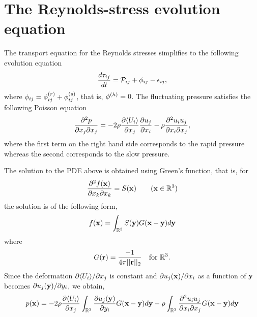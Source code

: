 \documentclass[oneside,a4paper,11pt]{report}
\begin{document}
\section{The Reynolds-stress evolution equation}

The transport equation for the Reynolds stresses simplifies to the following evolution equation
\begin{equation}
\frac{d \tau_{ij}}{dt} = \mathcal{P}_{ij} +\phi_{ij} - \epsilon_{ij},
\end{equation}
where $\phi_{ij} = \phi^{(r)}_{ij} + \phi^{(s)}_{ij}$, that is, $\phi^{(h)} = 0$. The fluctuating pressure satisfies the following Poisson equation
\begin{equation}
\frac{\partial^2 p}{\partial x_j \partial x_j} = -2 \rho \frac{\partial \langle U_i \rangle}{\partial x_j} \frac{\partial u_j}{\partial x_i}  - \rho \frac{\partial^2 u_i u_j}{\partial x_i \partial x_j},
\end{equation}
where the first term on the right hand side corresponds to the rapid pressure whereas the second corresponds to the slow pressure.

The solution to the PDE above is obtained using Green's function, that is, for 
\begin{equation}
\frac{\partial^2 f(\mathbf{x})}{\partial x_k \partial x_k} = S(\mathbf{x}) \qquad (\mathbf{x} \in {\mathbb{R}^3})
\end{equation}
the solution is of the following form, 
\begin{equation}
f(\mathbf{x}) = \int_{\mathbb{R}^3} S(\mathbf{y}) G(\mathbf{x} - \mathbf{y}) d\mathbf{y}
\end{equation}
where 
\begin{equation}
G(\mathbf{r}) = \frac{-1}{4\pi ||\mathbf{r}||_2} \quad \text{for } {\mathbb{R}^3}.
\end{equation}
Since the deformation $\partial \langle U_i \rangle / \partial x_j$ is constant and $\partial u_j(\mathbf{x}) / \partial x_i$ as a function of $\mathbf{y}$ becomes $\partial u_j(\mathbf{y}) / \partial y_i$, we obtain,
\begin{equation}
\label{pfluc_homo}
p(\mathbf{x}) =  -2 \rho \frac{\partial \langle U_i \rangle}{\partial x_j} \int_{\mathbb{R}^3} \frac{\partial u_j(\mathbf{y})}{\partial y_i} G(\mathbf{x}-\mathbf{y}) d\mathbf{y} - \rho \int_{\mathbb{R}^3} \frac{\partial^2 u_i u_j}{\partial x_i \partial x_j} G(\mathbf{x} - \mathbf{y}) d\mathbf{y} 
\end{equation}
\end{document}
